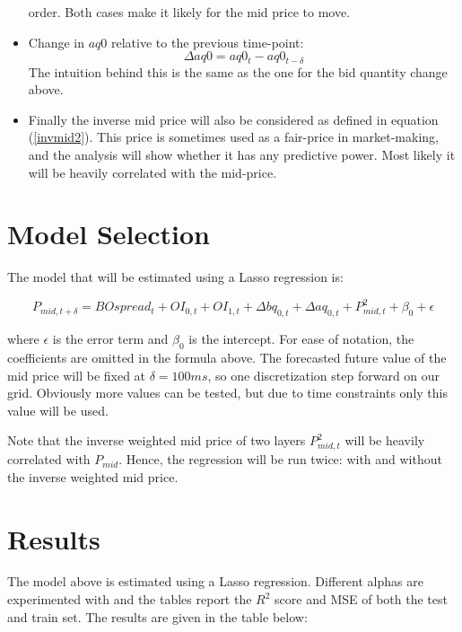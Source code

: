\documentclass[english, 11pt, a4paper]{article}
\begin{document}
\begin{itemize}
        order. Both cases make it likely for the mid price to move.
    \item Change in $aq0$ relative to the previous time-point:
        \begin{equation}
            \Delta aq0 = aq0_{t} - aq0_{t-\delta} 
        \end{equation}
        The intuition behind this is the same as the one for the bid quantity change above. 
    \item Finally the inverse mid price will also be considered as defined in equation
        (\ref{invmid2}). This price is sometimes used as a fair-price in market-making, and the
        analysis will show whether it has any predictive power. Most likely it will be heavily
        correlated with the mid-price.
\end{itemize}



\section{Model Selection}
The model that will be estimated using a Lasso regression is:

\begin{equation}
    P_{mid, t + \delta} = BOspread_{t} + OI_{0, t} + OI_{1,t} + \Delta bq_{0,t} + \Delta aq_{0,t} +
    P_{mid, t}^2 + \beta_0 + \epsilon 
\end{equation}

where $\epsilon$ is the error term and $\beta_0$ is the intercept. For ease of notation, the
coefficients are omitted in the formula above. The forecasted future value of the mid price will be
fixed at $\delta = 100ms$, so one discretization step forward on our grid. Obviously more values can
be tested, but due to time constraints only this value will be used.

Note that the inverse weighted mid price of two layers $P_{mid, t}^2$ will be heavily correlated with $P_{mid}$. 
Hence, the regression will be run twice: with and without the inverse weighted mid price.

\section{Results}
The model above is estimated using a Lasso regression. Different alphas are experimented with and
the tables report the $R^2$ score and MSE of both the test and train set. The results are given in
the table below:
\end{document}
